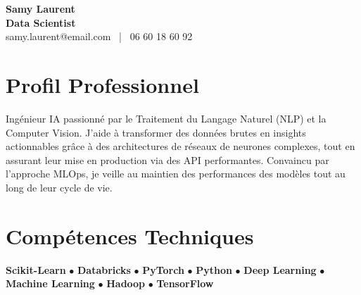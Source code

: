 \documentclass[11pt,a4paper]{article}
\begin{document}
\begin{center}
    {\Huge \textbf{Samy Laurent}} \\[0.2cm]
    {\Large \textbf{Data Scientist}} \\[0.1cm]
    samy.laurent@email.com \ | \ 06 60 18 60 92
\end{center}

\vspace{0.3cm}

\section*{Profil Professionnel}
\noindent
Ingénieur IA passionné par le Traitement du Langage Naturel (NLP) et la Computer Vision. J'aide à transformer des données brutes en insights actionnables grâce à des architectures de réseaux de neurones complexes, tout en assurant leur mise en production via des API performantes. Convaincu par l'approche MLOps, je veille au maintien des performances des modèles tout au long de leur cycle de vie.

\vspace{0.3cm}

\section*{Compétences Techniques}
\noindent
\textbf{Scikit-Learn} $\bullet$ \textbf{Databricks} $\bullet$ \textbf{PyTorch} $\bullet$ \textbf{Python} $\bullet$ \textbf{Deep Learning} $\bullet$ \textbf{Machine Learning} $\bullet$ \textbf{Hadoop} $\bullet$ \textbf{TensorFlow}

\vspace{0.3cm}

\end{document}

